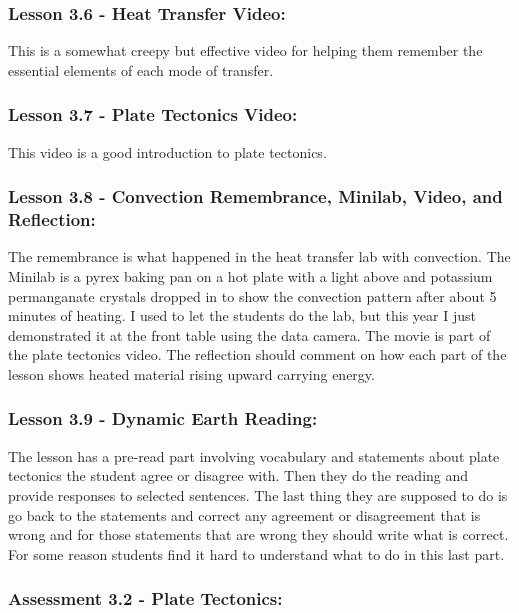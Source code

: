 \documentclass[12pt]{article}
\begin{document}
\subsubsection{Lesson 3.6 - Heat Transfer Video:}
\label{sec:org43255cf}

This is a somewhat creepy but effective video for
helping them remember the essential elements of each mode of transfer.


\subsubsection{Lesson 3.7 - Plate Tectonics Video:}
\label{sec:orge0577bc}

This video is a good introduction to plate tectonics.


\subsubsection{Lesson 3.8 - Convection Remembrance, Minilab, Video, and Reflection:}
\label{sec:org2e823d4}

The remembrance is what happened in the heat transfer lab with convection. The Minilab is a
pyrex baking pan on a hot plate with a light above and potassium permanganate crystals
dropped in to show the convection pattern after about 5 minutes of heating. I used to let
the students do the lab, but this year I just demonstrated it at the front table using the
data camera. The movie is part of the plate tectonics video. The reflection should
comment on how each part of the lesson shows heated material rising upward carrying
energy.


\subsubsection{Lesson 3.9 - Dynamic Earth Reading:}
\label{sec:org6c1bcd8}

The lesson has a pre-read part involving vocabulary and statements about plate tectonics the student agree or disagree with.
Then they do the reading and provide responses to selected sentences. The last thing
they are supposed to do is go back to the statements and correct any agreement or
disagreement that is wrong and for those statements that are wrong they should write
what is correct. For some reason students find it hard to understand what to do in this
last part.


\subsubsection{Assessment 3.2 - Plate Tectonics:}
\label{sec:org2b2b86f}
\end{document}
